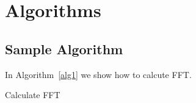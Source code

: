 \chapter{Algorithms}\label{ch:algorithms}

\section{Sample Algorithm}
In Algorithm~\ref{alg1} we show how to calcute FFT.

\begin{algorithm}
  \caption{Calculate FFT}
  \label{alg1}
  \begin{algorithmic}
    
  \end{algorithmic}
\end{algorithm}

\endinput
